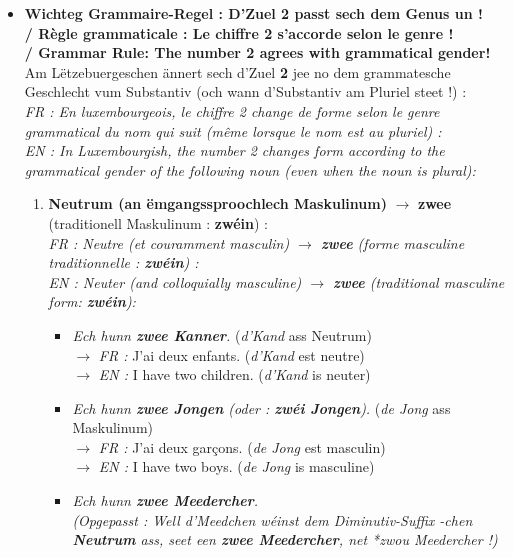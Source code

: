 \begin{itemize}
    \item \textbf{Wichteg Grammaire-Regel : D'Zuel 2 passt sech dem Genus un ! \\
    / Règle grammaticale : Le chiffre 2 s'accorde selon le genre ! \\
    / Grammar Rule: The number 2 agrees with grammatical gender!} \\
    Am Lëtzebuergeschen ännert sech d'Zuel \textbf{2} jee no dem grammatesche Geschlecht vum Substantiv (och wann d'Substantiv am Pluriel steet !) : \\
    \textit{FR : En luxembourgeois, le chiffre 2 change de forme selon le genre grammatical du nom qui suit (même lorsque le nom est au pluriel) :} \\
    \textit{EN : In Luxembourgish, the number 2 changes form according to the grammatical gender of the following noun (even when the noun is plural):}
    \begin{enumerate}
        \item \textbf{Neutrum (an ëmgangssproochlech Maskulinum)} $\rightarrow$ \textbf{zwee} (traditionell Maskulinum : \textbf{zwéin}) : \\
        \textit{FR : Neutre (et couramment masculin) $\rightarrow$ \textbf{zwee} (forme masculine traditionnelle : \textbf{zwéin}) :} \\
        \textit{EN : Neuter (and colloquially masculine) $\rightarrow$ \textbf{zwee} (traditional masculine form: \textbf{zwéin}):}
        \begin{itemize}
            \item \textit{Ech hunn \textbf{zwee Kanner}.} (\textit{d'Kand} ass Neutrum) \\
            $\rightarrow$ \textit{FR :} J'ai deux enfants. (\textit{d'Kand} est neutre) \\
            $\rightarrow$ \textit{EN :} I have two children. (\textit{d'Kand} is neuter)
            \item \textit{Ech hunn \textbf{zwee Jongen} (oder : \textbf{zwéi Jongen}).} (\textit{de Jong} ass Maskulinum) \\
            $\rightarrow$ \textit{FR :} J'ai deux garçons. (\textit{de Jong} est masculin) \\
            $\rightarrow$ \textit{EN :} I have two boys. (\textit{de Jong} is masculine)
            \item \textit{Ech hunn \textbf{zwee Meedercher}.} \\
            \textit{(Opgepasst : Well \textit{d'Meedchen} wéinst dem Diminutiv-Suffix \textit{-chen} \textbf{Neutrum} ass, seet een \textbf{zwee Meedercher}, net \textit{*zwou Meedercher} !)} \\

\end{itemize}
\end{enumerate}
\end{itemize}
